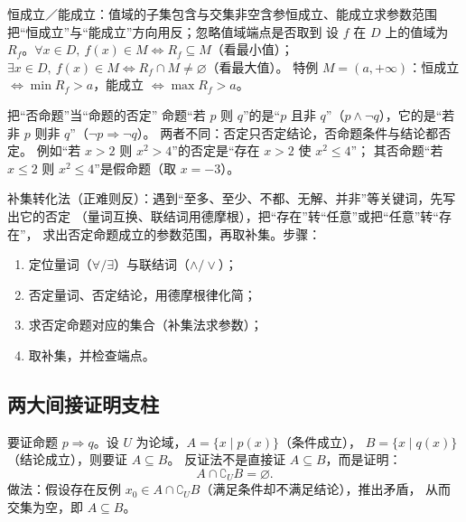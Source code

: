 \begin{explore}
\begin{conccard}[二级]{恒成立／能成立：值域的子集包含与交集非空}{含参恒成立、能成立求参数范围}{把“恒成立”与“能成立”方向用反；忽略值域端点是否取到}
设 $f$ 在 $D$ 上的值域为 $R_f$。$\forall x\in D,\ f(x)\in M\iff R_f\subseteq M$（看最小值）；
$\exists x\in D,\ f(x)\in M\iff R_f\cap M\neq\varnothing$（看最大值）。
特例 $M=(a,+\infty)$：恒成立 $\iff\min R_f>a$，能成立 $\iff\max R_f>a$。
\end{conccard}

\begin{commonerror}{把“否命题”当“命题的否定”}
命题“若 $p$ 则 $q$”的是“$p$ 且非 $q$”（$p\land\neg q$），它的是“若非 $p$ 则非 $q$”（$\neg p\Rightarrow\neg q$）。
两者不同：否定只否定结论，否命题条件与结论都否定。
例如“若 $x>2$ 则 $x^2>4$”的否定是“存在 $x>2$ 使 $x^2\leq4$”；
其否命题“若 $x\leq2$ 则 $x^2\leq4$”是假命题（取 $x=-3$）。
\end{commonerror}

\begin{method}
补集转化法（正难则反）：遇到“至多、至少、不都、无解、并非”等关键词，先写出它的否定
（量词互换、联结词用德摩根），把“存在”转“任意”或把“任意”转“存在”，
求出否定命题成立的参数范围，再取补集。步骤：
\begin{enumerate}
  \item 定位量词（$\forall/\exists$）与联结词（$\land/\lor$）；
  \item 否定量词、否定结论，用德摩根律化简；
  \item 求否定命题对应的集合（补集法求参数）；
  \item 取补集，并检查端点。
\end{enumerate}
\end{method}

\subsection{两大间接证明支柱}

要证命题 $p\Rightarrow q$。设 $U$ 为论域，$A=\{x\mid p(x)\}$（条件成立），
$B=\{x\mid q(x)\}$（结论成立），则要证 $A\subseteq B$。
反证法不是直接证 $A\subseteq B$，而是证明：
\[
  A\cap\complement_U B=\varnothing.
\]
做法：假设存在反例 $x_0\in A\cap\complement_U B$（满足条件却不满足结论），推出矛盾，
从而交集为空，即 $A\subseteq B$。


\end{explore}
